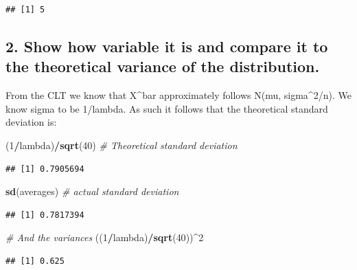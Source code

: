 \documentclass[]{article}
\newenvironment{Shaded}{\begin{snugshade}}{\end{snugshade}}
\newcommand{\CommentTok}[1]{\textcolor[rgb]{0.56,0.35,0.01}{\textit{#1}}}
\newcommand{\DecValTok}[1]{\textcolor[rgb]{0.00,0.00,0.81}{#1}}
\newcommand{\KeywordTok}[1]{\textcolor[rgb]{0.13,0.29,0.53}{\textbf{#1}}}
\newcommand{\NormalTok}[1]{#1}
\newcommand{\OperatorTok}[1]{\textcolor[rgb]{0.81,0.36,0.00}{\textbf{#1}}}
\begin{document}
\begin{verbatim}
## [1] 5
\end{verbatim}

\hypertarget{show-how-variable-it-is-and-compare-it-to-the-theoretical-variance-of-the-distribution.}{%
\subsection{2. Show how variable it is and compare it to the theoretical
variance of the
distribution.}\label{show-how-variable-it-is-and-compare-it-to-the-theoretical-variance-of-the-distribution.}}

From the CLT we know that X\^{}bar approximately follows N(mu,
sigma\^{}2/n). We know sigma to be 1/lambda. As such it follows that the
theoretical standard deviation is:

\begin{Shaded}
\begin{Highlighting}[]
\NormalTok{(}\DecValTok{1}\OperatorTok{/}\NormalTok{lambda)}\OperatorTok{/}\KeywordTok{sqrt}\NormalTok{(}\DecValTok{40}\NormalTok{) }\CommentTok{# Theoretical standard deviation}
\end{Highlighting}
\end{Shaded}

\begin{verbatim}
## [1] 0.7905694
\end{verbatim}

\begin{Shaded}
\begin{Highlighting}[]
\KeywordTok{sd}\NormalTok{(averages)        }\CommentTok{# actual standard deviation}
\end{Highlighting}
\end{Shaded}

\begin{verbatim}
## [1] 0.7817394
\end{verbatim}

\begin{Shaded}
\begin{Highlighting}[]
\CommentTok{# And the variances}
\NormalTok{((}\DecValTok{1}\OperatorTok{/}\NormalTok{lambda)}\OperatorTok{/}\KeywordTok{sqrt}\NormalTok{(}\DecValTok{40}\NormalTok{))}\OperatorTok{^}\DecValTok{2}
\end{Highlighting}
\end{Shaded}

\begin{verbatim}
## [1] 0.625
\end{verbatim}
\end{document}
